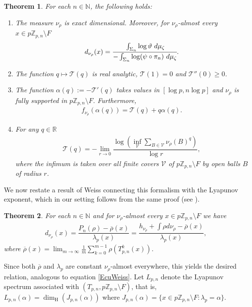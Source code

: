 \documentclass[11pt]{amsart}
\newtheorem{theorem}{Theorem}[section]
\theoremstyle{remark}
\numberwithin{equation}{section}
\newcommand{\N}{\mathbb{N}}
\newcommand{\R}{\mathbb{R}}
\newcommand{\Z}{\mathbb{Z}}
\begin{document}
\begin{theorem}\label{PrincipalPesinWeiss} 
For each $n\in \N$, the following holds:
\begin{enumerate}
    \item The measure $\nu_{\rho}$ is exact dimensional. Moreover, for $\nu_{\rho}$-almost every $x\in p\Z_{p,n}\setminus F$
        $$
             d_{\nu_{\rho}}(x)=\displaystyle \cfrac{\int_{\Sigma_{n}}\log\vartheta \ d\mu_{\zeta}}{-\int_{\Sigma_{n}}\log(\psi\circ \pi_{n}) \ d\mu_{\zeta}}.
        $$
    \item The function $q\mapsto \mathcal{T}(q)$ is real analytic, $\mathcal{T}(1)=0$ and $\mathcal{T}''(0)\geq 0$.
    \item The function $\alpha(q)
    :=-\mathcal{T}'(q)$ takes values in $[\log p,n\log p]$ and $\nu_{\rho}$ is fully supported in $p\Z_{p,n}\setminus F$. Furthermore, 
        \begin{align*}
            f_{\nu_{\rho}}(\alpha(q))=\mathcal{T}(q)+q\alpha(q).
        \end{align*}
    \item  For any $q\in \R$ 
     \begin{align*}
            \mathcal{T}(q)=-\lim_{r\to 0}\dfrac{\log\left(\inf_{\mathcal{V}}\sum_{B\in \mathcal{V}}\nu_{\rho}(B)^{q}\right)}{\log r},
        \end{align*}where the infimum is taken over all finite covers $\mathcal{V}$ of $p\Z_{p,n}\setminus F$ by open balls $B$ of radius $r$.
\end{enumerate}
\end{theorem}
 
We now restate a result of Weiss connecting this formalism with the Lyapunov exponent, which in our setting follows from the same proof (see \cite[Theorem 2.3]{we}).
\begin{theorem}\label{Theorem 2.3 Weiss}
    For each $n\in \N$ and for $\nu_{\rho}$-almost every $x\in p\Z_{p,n}\setminus F$ we have
    \begin{align*}
        d_{\nu_{\rho}}(x)=\dfrac{P_{n}(\rho)-\overline{\rho}(x)}{\lambda_{p}(x)}=\dfrac{h_{\nu_{\rho}}+\int \rho d\nu_{\rho}-\overline{\rho}(x)}{\lambda_{p}(x)},
    \end{align*}where $\displaystyle \overline{\rho}(x)=\lim_{m\to \infty}\frac{1}{m}\sum^{m-1}_{k=0}\rho\left(T_{p,n}^{k}(x)\right)$.
\end{theorem}
\noindent Since both $\overline{\rho}$ and $\lambda_p$ are constant $\nu_\rho$-almost everywhere, this yields the desired relation, analogous to equation \eqref{EcuWeiss}.
Let $L_{p,n}$ denote the Lyapunov spectrum associated with $\left(T_{p,n},p\Z_{p,n}\setminus F\right)$, that is, $L_{p,n}(\alpha)=\dim_{\mathrm{H}}(J_{p,n}(\alpha))$ where $J_{p,n}(\alpha)=\{x\in p\Z_{p,n}\setminus F:\lambda_{p}=\alpha\}$.
\end{document}
